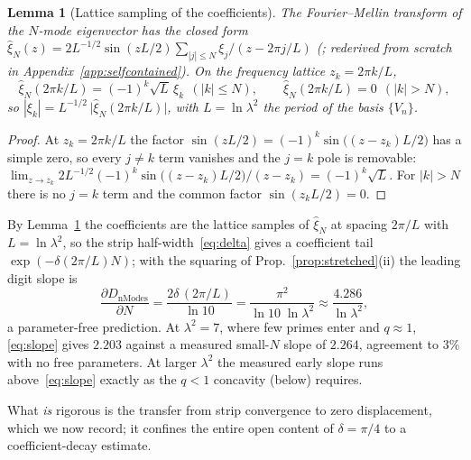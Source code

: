 \documentclass[11pt,a4paper]{article}
\newtheorem{lemma}{Lemma}
\begin{document}
\begin{lemma}[Lattice sampling of the coefficients]\label{lem:sampling}
The Fourier--Mellin transform of the $N$-mode eigenvector has the closed
form $\widehat\xi_N(z)=2L^{-1/2}\sin(zL/2)\sum_{|j|\le N}\xi_j/(z-2\pi j/L)$
(\cite[Prop.~5.9]{CCM2025}; rederived from scratch in
Appendix~\ref{app:selfcontained}). On the frequency lattice $z_k=2\pi k/L$,
\[
  \widehat\xi_N(2\pi k/L)=(-1)^k\sqrt{L}\,\xi_k\ \ (|k|\le N),\qquad
  \widehat\xi_N(2\pi k/L)=0\ \ (|k|>N),
\]
so $|\xi_k|=L^{-1/2}\,\bigl|\widehat\xi_N(2\pi k/L)\bigr|$, with
$L=\ln\lambda^2$ the period of the basis $\{V_n\}$.
\end{lemma}
\begin{proof}
At $z_k=2\pi k/L$ the factor $\sin(zL/2)=(-1)^k\sin\!\bigl((z-z_k)L/2\bigr)$
has a simple zero, so every $j\ne k$ term vanishes and the $j=k$ pole is
removable:
$\lim_{z\to z_k}2L^{-1/2}(-1)^k\sin\!\bigl((z-z_k)L/2\bigr)/(z-z_k)
=(-1)^k\sqrt{L}$. For $|k|>N$ there is no $j=k$ term and the common factor
$\sin(z_kL/2)=0$.
\end{proof}

By Lemma~\ref{lem:sampling} the coefficients are the lattice samples of
$\widehat\xi_N$ at spacing $2\pi/L$ with $L=\ln\lambda^2$, so the strip
half-width~\eqref{eq:delta} gives a coefficient tail $\exp(-\delta(2\pi/L)N)$;
with the squaring of Prop.~\ref{prop:stretched}(ii) the leading digit slope is
\begin{equation}\label{eq:slope}
  \frac{\partial D_{\mathrm{nModes}}}{\partial N}
  =\frac{2\delta\,(2\pi/L)}{\ln10}=\frac{\pi^2}{\ln10\;\ln\lambda^2}
  \approx\frac{4.286}{\ln\lambda^2},
\end{equation}
a parameter-free prediction. At $\lambda^2=7$, where few primes enter and
$q\approx1$, \eqref{eq:slope} gives $2.203$ against a measured small-$N$ slope
of $2.264$, agreement to $3\%$ with no free parameters. At larger $\lambda^2$
the measured early slope runs above~\eqref{eq:slope} exactly as the $q<1$
concavity (below) requires.

What \emph{is} rigorous is the transfer from strip convergence to zero
displacement, which we now record; it confines the entire open content of
$\delta=\pi/4$ to a coefficient-decay estimate.
\end{document}
